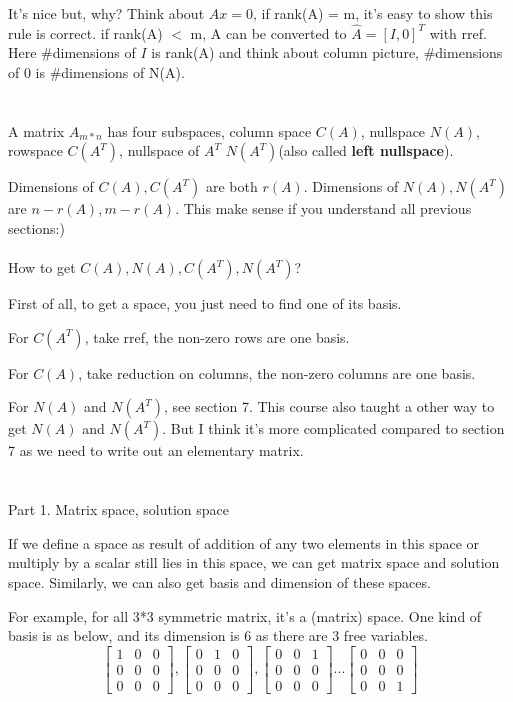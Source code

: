 \documentclass{article}
\begin{document}
\begin{spacing}{1.5}
It's nice but, why? Think about $Ax=0$, if rank(A) = m, it's easy to show this rule is correct. if rank(A) $<$ m, A can be converted to $\hat A=[I,0]^T$ with rref. Here \#dimensions of $I$ is rank(A) and think about column picture, \#dimensions of 0 is \#dimensions of N(A).


\section{}
\hspace*{0.5cm}A matrix $A_{m*n}$ has four subspaces, column space $C(A)$, nullspace  $N(A)$, rowspace $C(A^T)$, nullspace of $A^T$ $N(A^T)$(also called {\bfseries left nullspace}).

Dimensions of $C(A), C(A^T)$ are both $r(A)$. Dimensions of $N(A), N(A^T)$ are $n-r(A), m-r(A)$. This make sense if you understand all previous sections:)
\\\\How to get $C(A), N(A), C(A^T), N(A^T)$?

First of all, to get a space, you just need to find one of its basis.

For $C(A^T)$, take rref, the non-zero rows are one basis.

For $C(A)$, take reduction on columns, the non-zero columns are one basis.

For $N(A)$ and $N(A^T)$, see section 7. This course also taught a other way to get $N(A)$ and $N(A^T)$. But I think it's more complicated compared to section 7 as we need to write out an elementary matrix.\\


\section{}
Part 1. Matrix space, solution space

If we define a space as result of addition of any two elements in this space or multiply by a scalar still lies in this space, we can get matrix space and solution space. Similarly, we can also get basis and dimension of these spaces.

For example, for all 3*3 symmetric matrix, it's a (matrix) space. One kind of basis is as below, and its dimension is 6 as there are 3 free variables.
$$
\begin{bmatrix}
	1 & 0 & 0 \\
	0 & 0 & 0 \\ 
	0 & 0 & 0
\end{bmatrix}
,
\begin{bmatrix}
	0 & 1 & 0 \\
	0 & 0 & 0 \\ 
	0 & 0 & 0
\end{bmatrix}
,
\begin{bmatrix}
	0 & 0 & 1 \\
	0 & 0 & 0 \\ 
	0 & 0 & 0
\end{bmatrix}
...
\begin{bmatrix}
	0 & 0 & 0 \\
	0 & 0 & 0 \\ 
	0 & 0 & 1
\end{bmatrix}
$$


\end{spacing}
\end{document}
